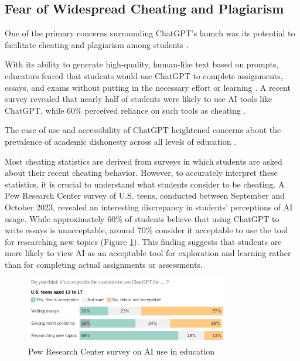 \documentclass{article}
\begin{document}
\subsection{Fear of Widespread Cheating and Plagiarism}
One of the primary concerns surrounding ChatGPT's launch
was its potential to facilitate cheating and plagiarism among students
\cite{missouri2023chatgpt} \cite{shiri2023chatgpt} \cite{reddit_chatgpt_academic_purposes}.


With its ability to generate high-quality, human-like text
based on prompts, educators feared that students would use
ChatGPT to complete assignments, essays, and exams without
putting in the necessary effort or learning
\cite{missouri2023chatgpt} \cite{reddit_chatgpt_academic_purposes}
\cite{theweek_ai_schools}.
A recent survey revealed that nearly half of students were likely
to use AI tools like ChatGPT, while 60\% perceived reliance on
such tools as cheating \cite{missouri2023chatgpt}.

The ease of use and accessibility of ChatGPT heightened concerns
about the prevalence of academic dishonesty across all levels of
education \cite{shiri2023chatgpt}\cite{reddit_chatgpt_academic_purposes}.

Most cheating statistics are derived from surveys in which students
are asked about their recent cheating behavior.
However, to accurately interpret these statistics, it is crucial
to understand what students consider to be cheating.
A Pew Research Center survey of U.S. teens, conducted between
September and October 2023, revealed an interesting discrepancy
in students' perceptions of AI usage. While approximately 60\%
of students believe that using ChatGPT to write essays is unacceptable, around 70\%
consider it acceptable to use the tool for researching new topics (Figure \ref{fig:chatgpt_acceptable_usecases}).
This finding suggests that students are more likely to view AI
as an acceptable tool for exploration and learning rather than for
completing actual assignments or assessments.

\begin{figure}[h]
    \centering
    \includegraphics[width=0.8\textwidth]{images/chatgpt_acceptable_usecases.png}
    \caption{Pew Research Center survey on AI use in education \cite{nytimes_chatbot_cheating}}
    \label{fig:chatgpt_acceptable_usecases}
\end{figure}
\end{document}
